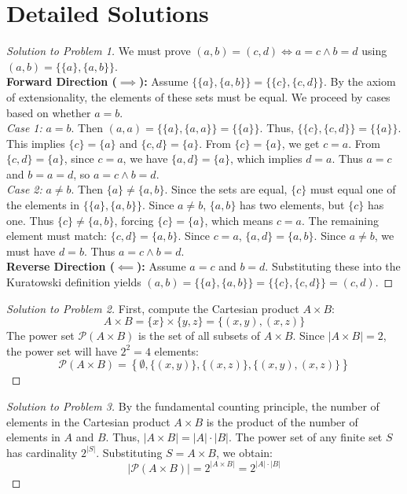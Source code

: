 \documentclass[11pt]{article}
\begin{document}
\newpage

\section{Detailed Solutions}
\label{sec:solutions}

\begin{proof}[Solution to Problem 1]
We must prove $(a,b) = (c,d) \iff a=c \land b=d$ using $(a,b) = \{\{a\}, \{a,b\}\}$. \\
\textbf{Forward Direction ($\implies$):} Assume $\{\{a\}, \{a,b\}\} = \{\{c\}, \{c,d\}\}$. By the axiom of extensionality, the elements of these sets must be equal. We proceed by cases based on whether $a=b$. \\
\textit{Case 1:} $a = b$. Then $(a,a) = \{\{a\}, \{a,a\}\} = \{\{a\}\}$. Thus, $\{\{c\}, \{c,d\}\} = \{\{a\}\}$. This implies $\{c\} = \{a\}$ and $\{c,d\} = \{a\}$. From $\{c\} = \{a\}$, we get $c=a$. From $\{c,d\} = \{a\}$, since $c=a$, we have $\{a,d\} = \{a\}$, which implies $d=a$. Thus $a=c$ and $b=a=d$, so $a=c \land b=d$. \\
\textit{Case 2:} $a \neq b$. Then $\{a\} \neq \{a,b\}$. Since the sets are equal, $\{c\}$ must equal one of the elements in $\{\{a\}, \{a,b\}\}$. Since $a \neq b$, $\{a,b\}$ has two elements, but $\{c\}$ has one. Thus $\{c\} \neq \{a,b\}$, forcing $\{c\} = \{a\}$, which means $c=a$. The remaining element must match: $\{c,d\} = \{a,b\}$. Since $c=a$, $\{a,d\} = \{a,b\}$. Since $a \neq b$, we must have $d=b$. Thus $a=c \land b=d$. \\
\textbf{Reverse Direction ($\impliedby$):} Assume $a=c$ and $b=d$. Substituting these into the Kuratowski definition yields $(a,b) = \{\{a\}, \{a,b\}\} = \{\{c\}, \{c,d\}\} = (c,d)$. 
\end{proof}

\begin{proof}[Solution to Problem 2]
First, compute the Cartesian product $A \times B$:
\[ A \times B = \{x\} \times \{y, z\} = \{(x, y), (x, z)\} \]
The power set $\mathcal{P}(A \times B)$ is the set of all subsets of $A \times B$. Since $|A \times B| = 2$, the power set will have $2^2 = 4$ elements:
\[ \mathcal{P}(A \times B) = \left\{ \emptyset, \{(x, y)\}, \{(x, z)\}, \{(x, y), (x, z)\} \right\} \]
\end{proof}

\begin{proof}[Solution to Problem 3]
By the fundamental counting principle, the number of elements in the Cartesian product $A \times B$ is the product of the number of elements in $A$ and $B$. Thus, $|A \times B| = |A| \cdot |B|$. 
The power set of any finite set $S$ has cardinality $2^{|S|}$. 
Substituting $S = A \times B$, we obtain:
\[ |\mathcal{P}(A \times B)| = 2^{|A \times B|} = 2^{|A| \cdot |B|} \]
\end{proof}
\end{document}
